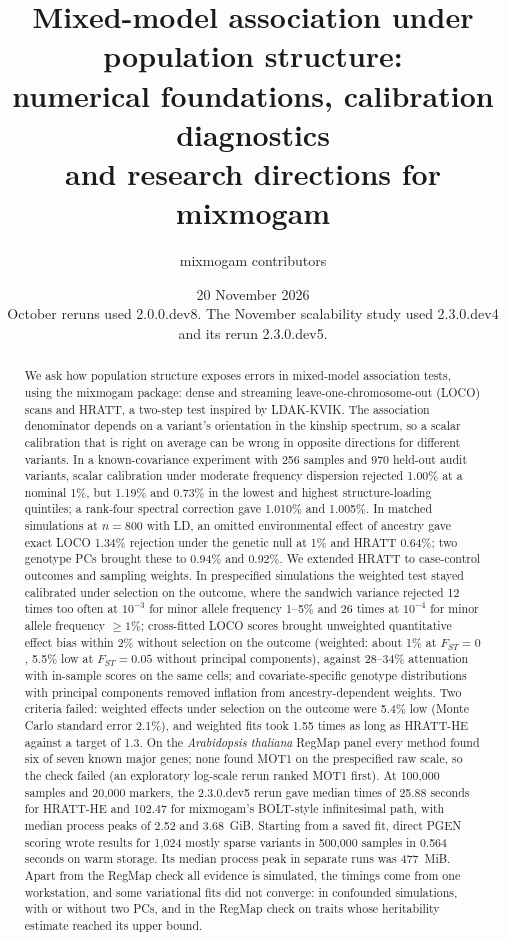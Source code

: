 \documentclass[11pt]{article}
\title{Mixed-model association under population structure:\\
numerical foundations, calibration diagnostics\\
and research directions for mixmogam}
\author{mixmogam contributors}
\date{20 November 2026\\\small October reruns used 2.0.0.dev8.
The November scalability study used 2.3.0.dev4 and its rerun 2.3.0.dev5.}
\begin{document}
\maketitle

\begin{abstract}
We ask how population structure exposes errors in mixed-model
association tests, using the mixmogam package: dense and streaming
leave-one-chromosome-out (LOCO) scans and HRATT, a two-step test inspired
by LDAK-KVIK. The association denominator depends on a variant's
orientation in the kinship spectrum, so a scalar calibration that is right
on average can be wrong in opposite directions for different variants. In a known-covariance
experiment with 256 samples and 970 held-out audit variants, scalar
calibration under moderate frequency dispersion rejected 1.00\% at a
nominal 1\%, but 1.19\% and 0.73\% in the lowest and highest
structure-loading quintiles; a rank-four spectral correction gave 1.010\%
and 1.005\%. In matched simulations at $n=800$ with LD, an omitted
environmental effect of ancestry gave exact LOCO 1.34\% rejection under the
genetic null at 1\% and HRATT 0.64\%; two genotype PCs brought these to
0.94\% and 0.92\%. We extended HRATT to case-control outcomes and
sampling weights. In prespecified simulations the weighted test stayed
calibrated under selection on the outcome, where the sandwich variance
rejected 12 times too often at $10^{-3}$ for minor allele frequency 1--5\%
and 26 times at $10^{-4}$ for minor allele frequency $\ge1\%$; cross-fitted LOCO scores
brought unweighted quantitative effect bias within 2\% without selection on
the outcome (weighted: about 1\% at $F_{ST}=0$, 5.5\% low at $F_{ST}=0.05$
without principal components), against 28--34\% attenuation with in-sample
scores on the same cells; and covariate-specific genotype
distributions with principal components removed inflation from
ancestry-dependent weights. Two criteria failed: weighted effects under selection on the
outcome were 5.4\% low (Monte Carlo standard error 2.1\%), and weighted fits
took 1.55 times as long as HRATT-HE against a target of 1.3. On the
\emph{Arabidopsis thaliana} RegMap panel every method found six of seven
known major genes; none found MOT1 on the prespecified raw scale, so the
check failed (an exploratory log-scale rerun ranked MOT1 first).
At 100,000 samples and 20,000 markers, the 2.3.0.dev5 rerun gave median
times of 25.88 seconds for HRATT-HE and 102.47 for mixmogam's BOLT-style
infinitesimal path, with median process peaks of 2.52 and 3.68~GiB.
Starting from a saved fit, direct PGEN scoring wrote results for 1,024
mostly sparse variants in 500,000 samples in 0.564 seconds on warm storage.
Its median process peak in separate runs was 477~MiB.
Apart from the RegMap check all evidence is simulated, the
timings come from one workstation, and some variational fits did not
converge: in confounded simulations, with or without two PCs, and in the
RegMap check on traits whose heritability estimate reached its upper bound.
\end{abstract}
\end{document}
